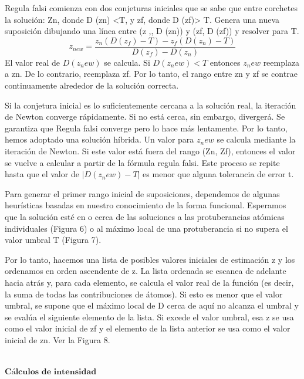 Regula falsi comienza con dos conjeturas iniciales que se sabe que entre corchetes la solución: Zn, donde D (zn) <T, y zf, donde D (zf)> T. Genera una nueva suposición dibujando una línea entre (z ,, D (zn)) y (zf, D (zf)) y resolver para T.
\[
	z_{new} = \frac{z_n (D(z_f) - T) - z_f ( D(z_n) - T)}{D(z_f) - D(z_n)}
\]
El valor real de $D (z_new)$ se calcula. Si $D (z_new) <T$ entonces $z_new$ reemplaza a zn. De lo contrario, reemplaza zf. Por lo tanto, el rango entre zn y zf se contrae continuamente alrededor de la solución correcta.

Si la conjetura inicial es lo suficientemente cercana a la solución real, la iteración de Newton converge rápidamente. Si no está cerca, sin embargo, divergerá. Se garantiza que Regula falsi converge pero lo hace más lentamente. Por lo tanto, hemos adoptado una solución híbrida. Un valor para $z_new$ se calcula mediante la iteración de Newton. Si este valor está fuera del rango (Zn, Zf), entonces el valor se vuelve a calcular a partir de la fórmula regula falsi. Este proceso se repite hasta que el valor de $| D (z_new) - T |$ es menor que alguna tolerancia de error t.

Para generar el primer rango inicial de suposiciones, dependemos de algunas heurísticas basadas en nuestro conocimiento de la forma funcional. Esperamos que la solución esté en o cerca de las soluciones a las protuberancias atómicas individuales (Figura 6) o al máximo local de una protuberancia si no supera el valor umbral T (Figura 7).

Por lo tanto, hacemos una lista de posibles valores iniciales de estimación z y los ordenamos en orden ascendente de z. La lista ordenada se escanea de adelante hacia atrás y, para cada elemento, se calcula el valor real de la función (es decir, la suma de todas las contribuciones de átomos). Si esto es menor que el valor umbral, se supone que el máximo local de D cerca de aquí no alcanza el umbral y se evalúa el siguiente elemento de la lista. Si excede el valor umbral, esa z se usa como el valor inicial de zf y el elemento de la lista anterior se usa como el valor inicial de zn. Ver la Figura 8.

${ }$\\
$\textbf{Cálculos de intensidad}$
${ }$\\

